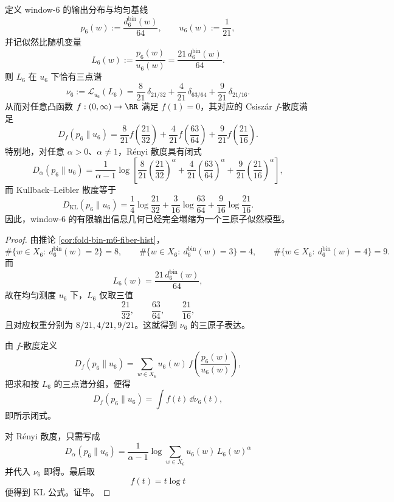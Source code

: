 \begin{theorem}\label{thm:conclusion-window6-three-atom-likelihood-law}
定义 window-\(6\) 的输出分布与均匀基线
\[
p_6(w):=\frac{d_6^{\mathrm{bin}}(w)}{64},
\qquad
u_6(w):=\frac1{21},
\]
并记似然比随机变量
\[
L_6(w):=\frac{p_6(w)}{u_6(w)}=\frac{21\,d_6^{\mathrm{bin}}(w)}{64}.
\]
则 \(L_6\) 在 \(u_6\) 下恰有三点谱
\[
\nu_6
:=
\mathcal L_{u_6}(L_6)
=
\frac8{21}\,\delta_{21/32}
+\frac4{21}\,\delta_{63/64}
+\frac9{21}\,\delta_{21/16}.
\]
从而对任意凸函数 \(f:(0,\infty)\to\RR\) 满足 \(f(1)=0\)，其对应的 Csisz\'ar \(f\)-散度满足
\[
D_f(p_6\|u_6)
=
\frac8{21}f\!\left(\frac{21}{32}\right)
+\frac4{21}f\!\left(\frac{63}{64}\right)
+\frac9{21}f\!\left(\frac{21}{16}\right).
\]
特别地，对任意 \(\alpha>0\)、\(\alpha\neq 1\)，Rényi 散度具有闭式
\[
D_\alpha(p_6\|u_6)
=
\frac{1}{\alpha-1}
\log\!\left[
\frac8{21}\left(\frac{21}{32}\right)^\alpha
+\frac4{21}\left(\frac{63}{64}\right)^\alpha
+\frac9{21}\left(\frac{21}{16}\right)^\alpha
\right],
\]
而 Kullback--Leibler 散度等于
\[
D_{\mathrm{KL}}(p_6\|u_6)
=
\frac14\log\frac{21}{32}
+\frac3{16}\log\frac{63}{64}
+\frac9{16}\log\frac{21}{16}.
\]
因此，window-\(6\) 的有限输出信息几何已经完全塌缩为一个三原子似然模型。
\end{theorem}
\begin{proof}
由推论 \ref{cor:fold-bin-m6-fiber-hist}，
\[
\#\{w\in X_6:\ d_6^{\mathrm{bin}}(w)=2\}=8,\qquad
\#\{w\in X_6:\ d_6^{\mathrm{bin}}(w)=3\}=4,\qquad
\#\{w\in X_6:\ d_6^{\mathrm{bin}}(w)=4\}=9.
\]
而
\[
L_6(w)=\frac{21\,d_6^{\mathrm{bin}}(w)}{64},
\]
故在均匀测度 \(u_6\) 下，\(L_6\) 仅取三值
\[
\frac{21}{32},\qquad \frac{63}{64},\qquad \frac{21}{16},
\]
且对应权重分别为 \(8/21,4/21,9/21\)。这就得到 \(\nu_6\) 的三原子表达。

由 \(f\)-散度定义
\[
D_f(p_6\|u_6)
=
\sum_{w\in X_6}u_6(w)\,f\!\left(\frac{p_6(w)}{u_6(w)}\right),
\]
把求和按 \(L_6\) 的三点谱分组，便得
\[
D_f(p_6\|u_6)=\int f(t)\,\dd\nu_6(t),
\]
即所示闭式。

对 Rényi 散度，只需写成
\[
D_\alpha(p_6\|u_6)
=
\frac{1}{\alpha-1}
\log\sum_{w\in X_6}u_6(w)\,L_6(w)^\alpha
\]
并代入 \(\nu_6\) 即得。最后取
\[
f(t)=t\log t
\]
便得到 KL 公式。证毕。
\end{proof}





